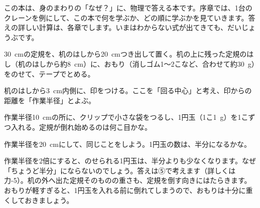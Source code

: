 この本は、身のまわりの「なぜ？」に、物理で答える本です。序章では、1台のクレーンを例にして、この本で何を学ぶか、どの順に学ぶかを見ていきます。答えの詳しい計算は、各章でします。いまはわからない式が出てきても、だいじょうぶです。

\begin{yattemiyou}[定規でクレーンを作ろう]
\begin{enumerate}[label={\bkcircled[bkGreen]{\arabic*}}, leftmargin=2.4\zw, itemsep=1pt, topsep=2pt]
\item \qty{30}{cm}の定規を、机のはしから\qty{20}{cm}つき出して置く。机の上に残った定規のはし（机のはしから約\qty{8}{cm}）に、おもり（消しゴム1〜2こなど、合わせて約\qty{30}{g}）をのせて、テープでとめる。
\item 机のはしから\qty{3}{cm}内側に、印をつける。ここを「回る中心」と考え、印からの距離を「作業半径」とよぶ。
\item 作業半径\qty{10}{cm}の所に、クリップで小さな袋をつるし、1円玉（1こ\qty{1}{g}）を1こずつ入れる。定規が倒れ始めるのは何こ目かな。
\item 作業半径を\qty{20}{cm}にして、同じことをしよう。1円玉の数は、半分になるかな。
\end{enumerate}
\end{yattemiyou}

\noindent 作業半径を2倍にすると、のせられる1円玉は、半分よりも少なくなります。なぜ「ちょうど半分」にならないのでしょう。答えは⑤で考えます（詳しくは力-5）。机の外へ出た定規そのものの重さも、定規を倒す向きにはたらきます。おもりが軽すぎると、1円玉を入れる前に倒れてしまうので、おもりは十分に重くしておきましょう。

\begin{omoidasou}
\end{omoidasou}


